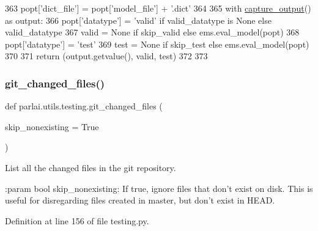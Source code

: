 \begin{DoxyCode}
363         popt[\textcolor{stringliteral}{'dict\_file'}] = popt[\textcolor{stringliteral}{'model\_file'}] + \textcolor{stringliteral}{'.dict'}
364 
365     with \hyperlink{namespaceparlai_1_1utils_1_1testing_ab00d4d693202afab92c06387aa50699b}{capture\_output}() \textcolor{keyword}{as} output:
366         popt[\textcolor{stringliteral}{'datatype'}] = \textcolor{stringliteral}{'valid'} \textcolor{keywordflow}{if} valid\_datatype \textcolor{keywordflow}{is} \textcolor{keywordtype}{None} \textcolor{keywordflow}{else} valid\_datatype
367         valid = \textcolor{keywordtype}{None} \textcolor{keywordflow}{if} skip\_valid \textcolor{keywordflow}{else} ems.eval\_model(popt)
368         popt[\textcolor{stringliteral}{'datatype'}] = \textcolor{stringliteral}{'test'}
369         test = \textcolor{keywordtype}{None} \textcolor{keywordflow}{if} skip\_test \textcolor{keywordflow}{else} ems.eval\_model(popt)
370 
371     \textcolor{keywordflow}{return} (output.getvalue(), valid, test)
372 
373 
\end{DoxyCode}
\mbox{\label{namespaceparlai_1_1utils_1_1testing_a2e61f8f35b8ccf518e3561a224781ced}} 
\subsubsection{\texorpdfstring{git\+\_\+changed\+\_\+files()}{git\_changed\_files()}}
{\footnotesize\ttfamily def parlai.\+utils.\+testing.\+git\+\_\+changed\+\_\+files (\begin{DoxyParamCaption}\item[{}]{skip\+\_\+nonexisting = {\ttfamily True} }\end{DoxyParamCaption})}

\begin{DoxyVerb}List all the changed files in the git repository.

:param bool skip_nonexisting:
    If true, ignore files that don't exist on disk. This is useful for
    disregarding files created in master, but don't exist in HEAD.
\end{DoxyVerb}
 

Definition at line 156 of file testing.\+py.


